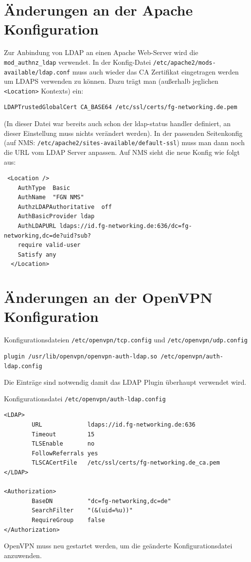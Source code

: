 \documentclass[11pt,a4paper,titlepage=firstiscover,headsepline,bibtotoc]{scrartcl} %
\begin{document}
\section{Änderungen an der Apache Konfiguration}\label{sec:Apache-Konfig}
Zur Anbindung von LDAP an einen Apache Web-Server wird die \texttt{mod\_authnz\_ldap} verwendet. In der Konfig-Datei \texttt{/etc/apache2/mods-available/ldap.conf} muss auch wieder das CA Zertifikat eingetragen werden um LDAPS verwenden zu können. Dazu trägt man (außerhalb jeglichen \texttt{<Location>} Kontexts) ein:
\begin{lstlisting}
LDAPTrustedGlobalCert CA_BASE64 /etc/ssl/certs/fg-networking.de.pem
\end{lstlisting}
(In dieser Datei war bereits auch schon der ldap-status handler definiert, an dieser Einstellung muss nichts verändert werden). In der passenden Seitenkonfig (auf NMS: \texttt{/etc/apache2/sites-available/default-ssl}) muss man dann noch die URL vom LDAP Server anpassen. Auf NMS sieht die neue Konfig wie folgt aus:
\begin{lstlisting}
 <Location />
    AuthType  Basic
    AuthName  "FGN NMS"
    AuthzLDAPAuthoritative  off
    AuthBasicProvider ldap
    AuthLDAPURL ldaps://id.fg-networking.de:636/dc=fg-networking,dc=de?uid?sub?
    require valid-user
    Satisfy any
  </Location>
\end{lstlisting}

\newpage
\section{Änderungen an der OpenVPN Konfiguration}\label{sec:VPN-Konfig}
Konfigurationsdateien \texttt{/etc/openvpn/tcp.config} und \texttt{/etc/openvpn/udp.config}
\begin{lstlisting}
plugin /usr/lib/openvpn/openvpn-auth-ldap.so /etc/openvpn/auth-ldap.config
\end{lstlisting}
Die Einträge sind notwendig damit das LDAP Plugin überhaupt verwendet wird.

Konfigurationsdatei \texttt{/etc/openvpn/auth-ldap.config}
\begin{lstlisting}
<LDAP>
        URL             ldaps://id.fg-networking.de:636
        Timeout         15
        TLSEnable       no
        FollowReferrals yes
        TLSCACertFile   /etc/ssl/certs/fg-networking.de_ca.pem
</LDAP>

<Authorization>
        BaseDN          "dc=fg-networking,dc=de"
        SearchFilter    "(&(uid=%u))"
        RequireGroup    false
</Authorization>
\end{lstlisting}
OpenVPN muss neu gestartet werden, um die geänderte Konfigurationsdatei anzuwenden.
\end{document}
